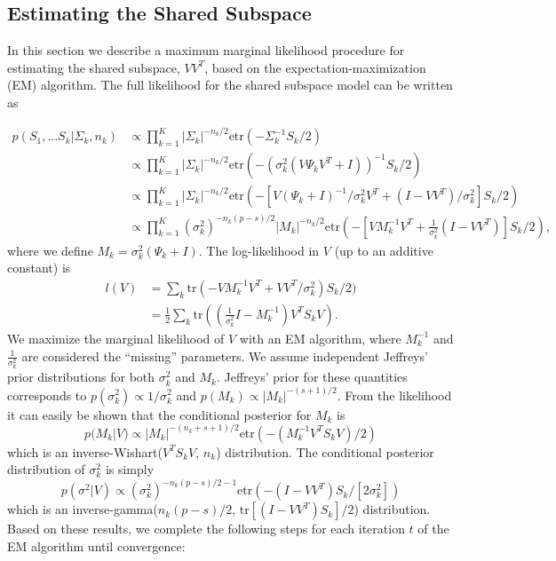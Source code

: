 \documentclass{statsoc}
\newcommand{\tr}{\text{tr}}
\newcommand{\etr}{\text{etr}}
\begin{document}

\subsection{Estimating the  Shared Subspace}
\label{sec:em}

In this section we describe a maximum marginal likelihood procedure for
estimating the shared subspace, $VV^T$, based on the
expectation-maximization (EM) algorithm.  The full likelihood
for the shared subspace model can be written as

\begin{align}
\nonumber p(S_1, ... S_k | \Sigma_k,n_k) &\propto \prod_{k=1}^K |\Sigma_k|^{-n_k/2}\etr(-\Sigma_k^{-1}S_k/2)  \\
\nonumber &\propto \prod_{k=1}^K  |\Sigma_k|^{-n_k/2}\etr(-(\sigma_k^2(V\Psi_kV^T +
  I))^{-1}S_k/2) \\
\nonumber &\propto \prod_{k=1}^K  |\Sigma_k|^{-n_k/2}\etr(-\left[V(\Psi_k +
  I)^{-1}/\sigma_k^2 V^T + (I-VV^T)/\sigma^2_k\right]S_k/2)
  \\
&\propto \prod_{k=1}^K  (\sigma_k^2)^{-n_k(p-s)/2}|M_k|^{-n_k/2}\etr(-\left[VM_k^{-1}V^T + \frac{1}{\sigma^2_k} (I-VV^T)\right]S_k/2) ,
\end{align}
%
\noindent where we define $M_k = \sigma_k^2(\Psi_k + I)$.  The log-likelihood in
$V$ (up to an additive constant) is
%
\begin{align}
\nonumber l(V) &= \sum_k \tr\left(-VM_k^{-1}V^T +
       VV^T/\sigma^2_k\right)S_k/2)\\
&=\frac{1}{2}\sum_k \tr\left((\frac{1}{\sigma_k^2}I-M_k^{-1})V^T
  S_kV\right).
\label{eqn:likV}
\end{align}
%
We maximize the marginal likelihood of $V$ with an EM algorithm, where
$M_k^{-1}$ and $\frac{1}{\sigma_k^2}$ are considered the
``missing'' parameters.  We assume independent Jeffreys'
prior distributions for both $\sigma_k^2$ and $M_k$.  Jeffreys' prior
for these quantities corresponds to
$p(\sigma_k^2) \propto 1/\sigma_k^2$ and
$p(M_k) \propto |M_k|^{-(s+1)/2}$.  From the likelihood it can easily
be shown that the conditional posterior for $M_k$ is
%
$$p(M_k | V) \propto |M_k|^{-(n_k + s + 1)/2}\etr(-(M_k^{-1}V^TS_kV)/2) $$
%
\noindent which is an inverse-Wishart($V^TS_kV$, $n_k$) distribution.  The
conditional posterior distribution of $\sigma_k^2$ is simply
%
$$p\left(\sigma^2 | V\right) \propto (\sigma_k^2)^{-n_k(p-s)/2-1}\etr\left(- (I-VV^T)S_k/[2\sigma_k^2]\right)  $$
%
\noindent which is an inverse-gamma($n_k(p-s)/2$,
$\text{tr}[(I-VV^T)S_k]/2$) distribution.  Based on these
results, we complete the following steps for each iteration $t$ of
the EM algorithm until convergence:
\end{document}
